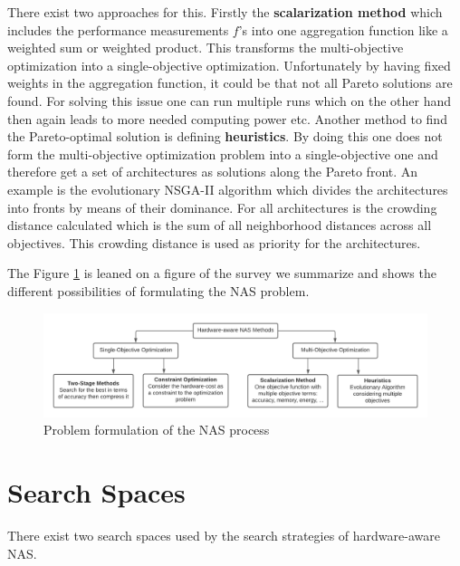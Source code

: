 \documentclass[conference]{IEEEtran}
\begin{document}
There exist two approaches for this. Firstly the \textbf{scalarization method} which includes the performance measurements $f$'s into one aggregation function like a weighted sum or weighted product. This transforms the multi-objective optimization into a single-objective optimization. Unfortunately by having fixed weights in the aggregation function, it could be that not all Pareto solutions are found. For solving this issue one can run multiple runs which on the other hand then again leads to more needed computing power etc. Another method to find the Pareto-optimal solution is defining \textbf{heuristics}. By doing this one does not form the multi-objective optimization problem into a single-objective one and therefore get a set of architectures as solutions along the Pareto front. An example is the evolutionary NSGA-II algorithm \cite{bib14} which divides the architectures into fronts by means of their dominance. For all architectures is the crowding distance calculated which is the sum of all neighborhood distances across all objectives. This crowding distance is used as priority for the architectures.  

The Figure \ref{fig:ProblemFormulation} is leaned on a figure of the survey \cite{bib1} we summarize and shows the different possibilities of formulating the NAS problem.

\begin{figure}[htbp]
\includegraphics[width=\textwidth]{ProblemFormulation.png}
\caption{Problem formulation of the NAS process \cite{bib1}}
\label{fig:ProblemFormulation}
\end{figure} 

\section{Search Spaces}
\label{section:SearchSpaces}
There exist two search spaces used by the search strategies of hardware-aware NAS. 
\end{document}
